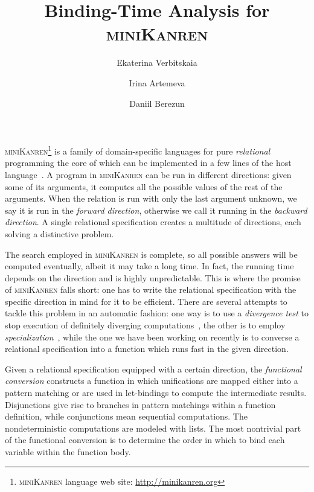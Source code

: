 \documentclass[submission,copyright,creativecommons]{eptcs}
\title{Binding-Time Analysis for \textsc{miniKanren}}
\author{Ekaterina Verbitskaia
\institute{JetBrains Research\\
Saint Petersburg, Russia}
\email{kajigor@gmail.com}
\and
Irina Artemeva
\institute{ITMO University\\
Saint Petersburg, Russia}
\email{irina-pluralia@rambler.ru}
\and
Daniil Berezun
\institute{JetBrains Research\\
Saint Petersburg, Russia}
\email{daniil.berezun@jetbrains.com }
}
\newcommand{\miniKanren}{\textsc{miniKanren}}
\begin{document}
\maketitle


\miniKanren{}\footnote{\miniKanren{} language web site: \url{http://minikanren.org}} is a family of domain-specific languages for pure \emph{relational} programming the core of which can be implemented in a few lines of the host language~\cite{hemann2013ukanren}.
A program in \miniKanren{} can be run in different directions: given some of its arguments, it computes all the possible values of the rest of the arguments.
When the relation is run with only the last argument unknown, we say it is run in the \emph{forward direction}, otherwise we call it running in the \emph{backward direction}.
A single relational specification creates a multitude of directions, each solving a distinctive problem.

The search employed in \miniKanren{} is complete, so all possible answers will be computed eventually, albeit it may take a long time.
In fact, the running time depends on the direction and is highly unpredictable.
This is where the promise of \miniKanren{} falls short: one has to write the relational specification with the specific direction in mind for it to be efficient.
There are several attempts to tackle this problem in an automatic fashion: one way is to use a \emph{divergence test} to stop execution of definitely diverging computations~\cite{rozplokhas2018improving}, the other is to employ \emph{specialization}~\cite{lozov2019relational}, while the one we have been working on recently is to converse a relational specification into a function which runs fast in the given direction.

Given a relational specification equipped with a certain direction, the \emph{functional conversion} constructs a function in which unifications are mapped either into a pattern matching or are used in let-bindings to compute the intermediate results.
Disjunctions give rise to branches in pattern matchings within a function definition, while conjunctions mean sequential computations.
The nondeterministic computations are modeled with lists.
The most nontrivial part of the functional conversion is to determine the order in which to bind each variable within the function body.
\end{document}
